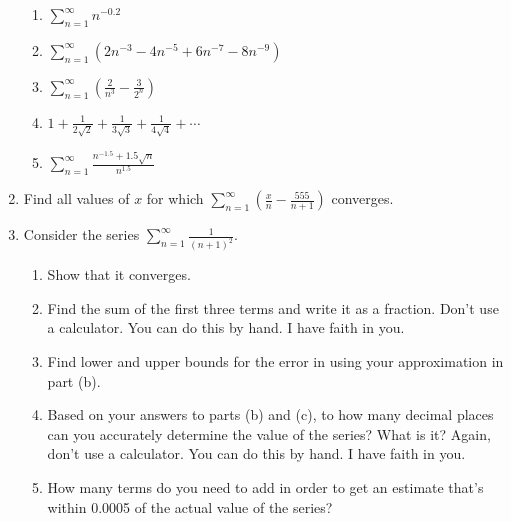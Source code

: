 \documentclass[11pt]{article}
\begin{document}
\begin{enumerate}
\begin{enumerate}
    \item $\displaystyle \sum_{n=1}^\infty n^{-0.2}$

    \item $\displaystyle \sum_{n=1}^\infty
    \left( 2n^{-3} - 4n^{-5} + 6n^{-7} - 8n^{-9} \right)$

    \item $\displaystyle \sum_{n=1}^\infty
    \left( \frac2{n^3} - \frac3{2^n} \right)$

    \item $\displaystyle 
    1 + \frac1{2\sqrt2} + \frac1{3\sqrt3} + \frac1{4\sqrt4} + \cdots$

    \item $\displaystyle \sum_{n=1}^\infty
    \frac{n^{-1.5}+1.5\sqrt n}{n^{1.5}}$

  \end{enumerate}

  \item Find all values of $x$ for which $\displaystyle \sum_{n=1}^\infty \left(
  \frac xn - \frac{555}{n+1} \right)$ converges.

  \item Consider the series $\displaystyle \sum_{n=1}^\infty \frac1{(n+1)^2}$.
  \begin{enumerate}
    
    \item Show that it converges.

    \item Find the sum of the first three terms and write it as a fraction.
    Don't use a calculator. You can do this by hand. I have faith in you.

    \item Find lower and upper bounds for the error in using your approximation
    in part (b).
    
    \item Based on your answers to parts (b) and (c), to how many decimal places
    can you accurately determine the value of the series? What is it? Again,
    don't use a calculator. You can do this by hand. I have faith in you.

    \item How many terms do you need to add in order to get an estimate that's
    within 0.0005 of the actual value of the series?

  \end{enumerate}

\end{enumerate}
\end{document}
